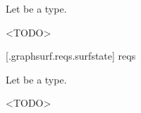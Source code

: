\pnum
Let  be a \graphicssurfacestemplparam type.

\pnum
<TODO>


 [\iotwod.graphsurf.reqs.surfstate]{ reqs}

\pnum
Let  be a \graphicssurfacestemplparam type.

\pnum
<TODO>


